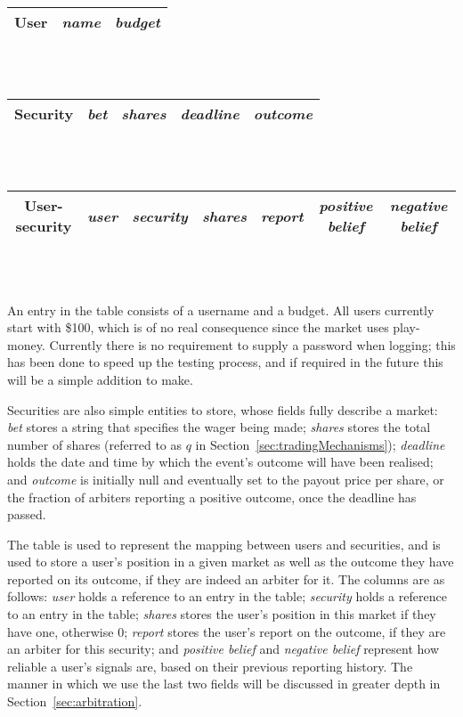\begin{table}[ht]
	\centering
	\begin{tabular}{|c|c|c|}
		\hline
		\textbf{User} & \emph{name} & \emph{budget} \\ \hline
	\end{tabular} \\~\\

	\begin{tabular}{|c|c|c|c|c|}
		\hline
		\textbf{Security} & \emph{bet} & \emph{shares} & \emph{deadline} &
		\emph{outcome} \\ \hline
	\end{tabular} \\~\\

	\begin{tabular}{|c|c|c|c|c|c|c|}
		\hline
		\textbf{User-security} & \emph{user} & \emph{security} & \emph{shares}
		& \emph{report} & \emph{positive belief} & \emph{negative belief} \\
		\hline
	\end{tabular} \\~\\
\end{table}

An entry in the  table consists of a username and a budget. All
users currently start with \$100, which is of no real consequence since the
market uses play-money. Currently there is no requirement to supply a password
when logging; this has been done to speed up the testing process, and if
required in the future this will be a simple addition to make.

Securities are also simple entities to store, whose fields fully describe a
market: \emph{bet} stores a string that specifies the wager being made;
\emph{shares} stores the total number of shares (referred to as $q$ in
Section~\ref{sec:tradingMechanisms}); \emph{deadline} holds the date and time
by which the event's outcome will have been realised; and \emph{outcome} is
initially null and eventually set to the payout price per share, or the
fraction of arbiters reporting a positive outcome, once the deadline has
passed.

The  table is used to represent the mapping between users
and securities, and is used to store a user's position in a given market as
well as the outcome they have reported on its outcome, if they are indeed an
arbiter for it. The columns are as follows: \emph{user} holds a reference to an
entry in the  table; \emph{security} holds a reference to an entry
in the  table; \emph{shares} stores the user's position in this
market if they have one, otherwise 0; \emph{report} stores the user's report on
the outcome, if they are an arbiter for this security; and \emph{positive
belief} and \emph{negative belief} represent how reliable a user's signals are,
based on their previous reporting history. The manner in which we use the last
two fields will be discussed in greater depth in Section~\ref{sec:arbitration}.

